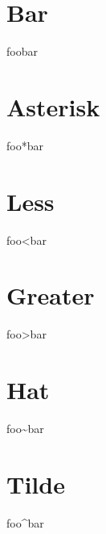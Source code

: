 \documentclass[a4paper,11pt,oneside,openany,report]{jsbook}
\begin{document}
\section{Bar}\label{sec:Special characters/Bar}
foo{\textbar}bar

\section{Asterisk}\label{sec:Special characters/Asterisk}
foo*bar

\section{Less}\label{sec:Special characters/Less}
foo{\textless}bar

\section{Greater}\label{sec:Special characters/Greater}
foo{\textgreater}bar

\section{Hat}\label{sec:Special characters/Hat}
foo{\textasciitilde}bar

\section{Tilde}\label{sec:Special characters/Tilde}
foo{\textasciicircum}bar
\end{document}
